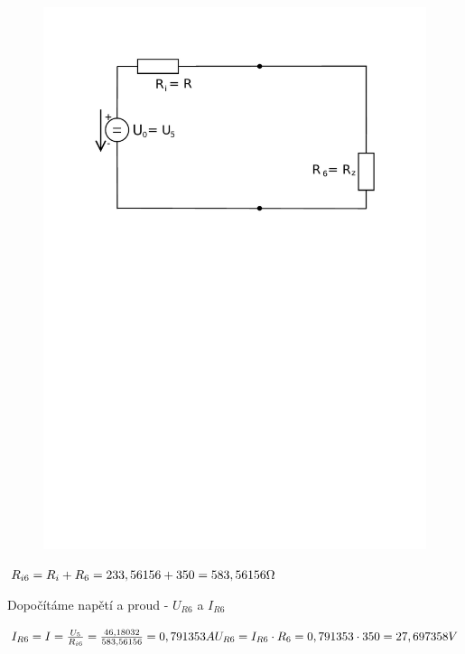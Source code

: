 \documentclass[12pt,a4paper]{article}         %
\begin{document}
    \begin{figure}[H] 
		\vspace{-0.6cm}
		\center\includegraphics[trim={0 18cm 0 0},clip,width=0.8\linewidth]{obr/2_6}
    \end{figure}
    
    {\Large
        \begin{math}\\
        R_{i6} = R_i + R_6 = 233,56156 + 350 = 583,56156 {\Omega}\\
        \end{math}
    }
    
    {\Large Dopočítáme napětí a proud - $U_{R6}$ a $I_{R6}$}
    
    {\Large
        \begin{math}\\
        I_{R6} = I = \frac{U_5}{R_{i6}} = \frac{46,18032}{583,56156} = 0,791353 A\\
        U_{R6} = I_{R6} \cdot R_6 = 0,791353 \cdot 350 = 27,697358 V\\
        \end{math}
    }
    
    \newpage
    
\end{document}
